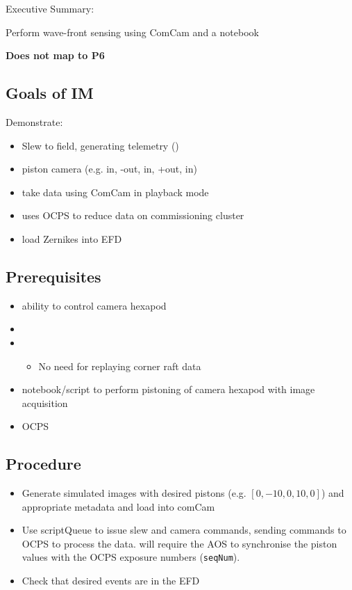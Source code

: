 
Executive Summary:

Perform wave-front sensing using ComCam and a notebook

\textbf{Does not map to P6}

\subsection{Goals of IM}
Demonstrate:
\begin{itemize}
\item Slew to field, generating telemetry (\cf {})
\item piston camera (e.g. in, -out, in, +out, in)
\item take data using ComCam in playback mode
\item uses \gls{OCPS} to reduce data on commissioning cluster
\item load Zernikes into \gls{EFD}
\end{itemize}

\subsection{Prerequisites}
\begin{itemize}
\item ability to control camera hexapod
\item {}
\item {}
  \begin{itemize}
  \item No need for replaying corner raft data
  \end{itemize}
\item notebook/script to perform pistoning of camera hexapod with image acquisition
\item \gls{OCPS}
\end{itemize}

\subsection{Procedure}
\begin{itemize}
\item Generate simulated images with desired pistons (e.g. $[0, -10, 0, 10, 0]$) and appropriate
  metadata and load into comCam
\item Use \gls{scriptQueue} to issue slew and camera commands, sending commands to \gls{OCPS}
      to process the data.  \Nb will require the \gls{AOS} to synchronise the piston values
      with the OCPS exposure numbers (\texttt{seqNum}).
\item Check that desired events are in the EFD
\end{itemize}
